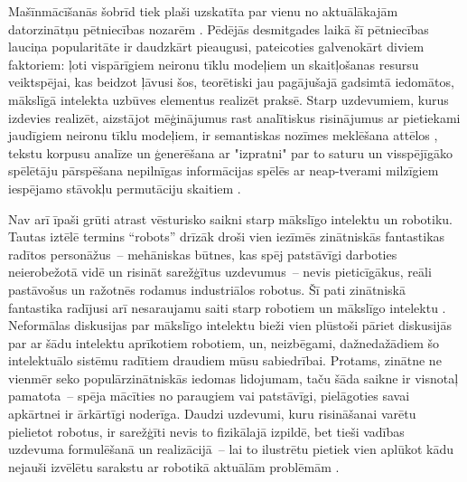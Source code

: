 \documentclass[12pt, a4paper]{article}
\numberwithin{equation}{section} %
\begin{document}
Mašīnmācīšanās šobrīd tiek plaši uzskatīta par vienu no aktuālākajām datorzinātņu pētniecības nozarēm \cite{no_shit}. Pēdējās desmitgades laikā šī pētniecības lauciņa popularitāte ir daudzkārt pieaugusi, pateicoties galvenokārt diviem faktoriem: ļoti vispārīgiem neironu tīklu modeļiem un skaitļošanas resursu veiktspējai, kas beidzot ļāvusi šos, teorētiski jau pagājušajā gadsimtā \cite{mcculloch1943logical, linnainmaa1970representation, fukushima1988neocognitron} iedomātos, mākslīgā intelekta uzbūves elementus realizēt praksē. Starp uzdevumiem, kurus izdevies realizēt, aizstājot mēģinājumus rast analītiskus risinājumus ar pietiekami jaudīgiem neironu tīklu modeļiem, ir semantiskas nozīmes meklēšana attēlos \cite{krizhevsky2012imagenet}, tekstu korpusu analīze un ģenerēšana ar "izpratni" par to saturu \cite{vaswani2017attention} un visspējīgāko spēlētāju pārspēšana nepilnīgas informācijas spēlēs ar neap-tverami milzīgiem iespējamo stāvokļu permutāciju skaitiem \cite{silver2016mastering}.

Nav arī īpaši grūti atrast vēsturisko saikni starp mākslīgo intelektu un robotiku. Tautas iztēlē termins ``robots'' drīzāk droši vien iezīmēs zinātniskās fantastikas radītos personāžus~-- mehāniskas būtnes, kas spēj patstāvīgi darboties neierobežotā vidē un risināt sarežģītus uzdevumus~-- nevis pieticīgākus, reāli pastāvošus un ražotnēs rodamus industriālos robotus. Šī pati zinātniskā fantastika radījusi arī nesaraujamu saiti starp robotiem un mākslīgo intelektu \cite{asimov2004robot}. Neformālas diskusijas par mākslīgo intelektu bieži vien plūstoši pāriet diskusijās par ar šādu intelektu aprīkotiem robotiem, un, neizbēgami, dažnedažādiem šo intelektuālo sistēmu radītiem draudiem mūsu sabiedrībai. Protams, zinātne ne vienmēr seko populārzinātniskās iedomas lidojumam, taču šāda saikne ir visnotaļ pamatota~-- spēja mācīties no paraugiem vai patstāvīgi, pielāgoties savai apkārtnei ir ārkārtīgi noderīga. Daudzi uzdevumi, kuru risināšanai varētu pielietot robotus, ir sarežģīti nevis to fizikālajā izpildē, bet tieši vadības uzdevuma formulēšanā un realizācijā~-- lai to ilustrētu pietiek vien aplūkot kādu nejauši izvēlētu sarakstu ar robotikā aktuālām problēmām \cite{popsci}.
\end{document}
